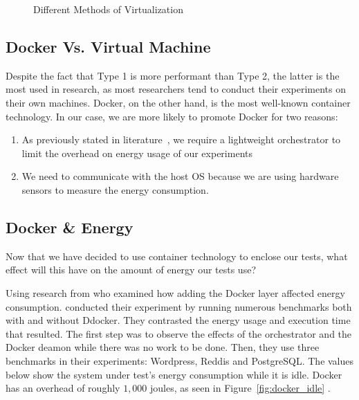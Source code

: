 \begin{figure}
    \caption{Different Methods of Virtualization}\label{environement:virtualization_technique}
\end{figure}


\subsection{Docker Vs. Virtual Machine}
Despite the fact that Type 1 is more performant than Type 2, the latter is the most used in research, as most researchers tend to conduct their experiments on their own machines. Docker, on the other hand, is the most well-known container technology. In our case, we are more likely to promote Docker for two reasons:
\begin{enumerate}
    \item As previously stated in literature~\cite{van2016power,morabito_power_2015}, we require a lightweight orchestrator to limit the overhead on energy usage of our experiments
    \item We need to communicate with the host OS because we are using hardware sensors to measure the energy consumption.
\end{enumerate}



\subsection{Docker \& Energy}
Now that we have decided to use container technology to enclose our tests, what effect will this have on the amount of energy our tests use?


Using research from \cite{eddie_antonio_santos_how} who examined how adding the Docker layer affected energy consumption. \citeauthor{eddie_antonio_santos_how} conducted their experiment by running numerous benchmarks both with and without Ddocker. They contrasted the energy usage and execution time that resulted.
The first step was to observe the effects of the orchestrator and the Docker deamon while there was no work to be done.
Then, they use three benchmarks in their experiments: Wordpress, Reddis and PostgreSQL.
The values below show the system under test's energy consumption while it is idle.
Docker has an overhead of roughly $1,000$  joules, as seen in Figure~\ref{fig:docker_idle} .


